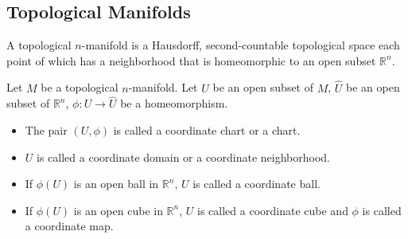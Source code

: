 \subsection{Topological Manifolds}

\begin{defn}
  A topological $n$-manifold is a Hausdorff, second-countable topological space each point of which has a neighborhood that is homeomorphic to an open subset $\mathbb{R}^n$.
\end{defn}

\begin{defn}
  Let $M$ be a topological $n$-manifold.
  Let $U$ be an open subset of $M$, $\hat{U}$ be an open subset of $\mathbb{R}^n$, $\phi: U \rightarrow \hat{U}$ be a homeomorphism.
  \begin{itemize}
    \item
      The pair $(U, \phi)$ is called a coordinate chart or a chart.
    \item
      $U$ is called a coordinate domain or a coordinate neighborhood.
    \item
      If $\phi(U)$ is an open ball in $\mathbb{R}^n$, $U$ is called a coordinate ball.
    \item
      If $\phi(U)$ is an open cube in $\mathbb{R}^n$, $U$ is called a coordinate cube and $\phi$ is called a coordinate map.
  \end{itemize}
\end{defn}
